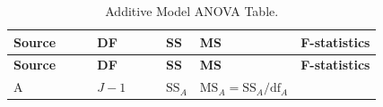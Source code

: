 \documentclass[]{book}
\theoremstyle{definition}
\theoremstyle{definition}
\theoremstyle{remark}
\begin{document}
\begin{longtable}[]{@{}lllll@{}}
\caption{\label{tab:Table4-2} Additive Model ANOVA Table.}\tabularnewline
\toprule
\begin{minipage}[b]{0.17\columnwidth}\raggedright\strut
\textbf{Source}~~~~\strut
\end{minipage} & \begin{minipage}[b]{0.18\columnwidth}\raggedright\strut
\textbf{DF}~~~~~\strut
\end{minipage} & \begin{minipage}[b]{0.21\columnwidth}\raggedright\strut
\textbf{SS}\strut
\end{minipage} & \begin{minipage}[b]{0.18\columnwidth}\raggedright\strut
\textbf{MS}\strut
\end{minipage} & \begin{minipage}[b]{0.12\columnwidth}\raggedright\strut
\textbf{F-statistics}\strut
\end{minipage}\tabularnewline
\midrule
\endfirsthead
\toprule
\begin{minipage}[b]{0.17\columnwidth}\raggedright\strut
\textbf{Source}~~~~\strut
\end{minipage} & \begin{minipage}[b]{0.18\columnwidth}\raggedright\strut
\textbf{DF}~~~~~\strut
\end{minipage} & \begin{minipage}[b]{0.21\columnwidth}\raggedright\strut
\textbf{SS}\strut
\end{minipage} & \begin{minipage}[b]{0.18\columnwidth}\raggedright\strut
\textbf{MS}\strut
\end{minipage} & \begin{minipage}[b]{0.12\columnwidth}\raggedright\strut
\textbf{F-statistics}\strut
\end{minipage}\tabularnewline
\midrule
\endhead
\begin{minipage}[t]{0.17\columnwidth}\raggedright\strut
A\strut
\end{minipage} & \begin{minipage}[t]{0.18\columnwidth}\raggedright\strut
\(J-1\)\strut
\end{minipage} & \begin{minipage}[t]{0.21\columnwidth}\raggedright\strut
\(\text{SS}_A\)\strut
\end{minipage} & \begin{minipage}[t]{0.18\columnwidth}\raggedright\strut
\(\text{MS}_A=\text{SS}_A/\text{df}_A\)\strut

\end{minipage}
\end{longtable}
\end{document}
